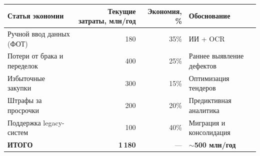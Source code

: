\documentclass[12pt,a4paper]{article}
\begin{document}
\begin{table}[H]
\centering
\small
\begin{tabular}{|p{50mm}|r|r|p{40mm}|}
\hline
\rowcolor{samoletlight}
\textbf{Статья экономии} & \textbf{Текущие затраты, млн/год} & \textbf{Экономия, \%} & \textbf{Обоснование} \\
\hline
Ручной ввод данных (ФОТ) & 180 & 35\% & ИИ + OCR \\
\hline
Потери от брака и переделок & 400 & 25\% & Раннее выявление дефектов \\
\hline
Избыточные закупки & 300 & 15\% & Оптимизация тендеров \\
\hline
Штрафы за просрочки & 200 & 20\% & Предиктивная аналитика \\
\hline
Поддержка legacy-систем & 100 & 40\% & Миграция и консолидация \\
\hline
\rowcolor{samoletlight}
\textbf{ИТОГО} & \textbf{1\,180} & --- & \textbf{$\sim$500 млн/год} \\
\hline
\end{tabular}
\end{table}

\newpage
\end{document}
